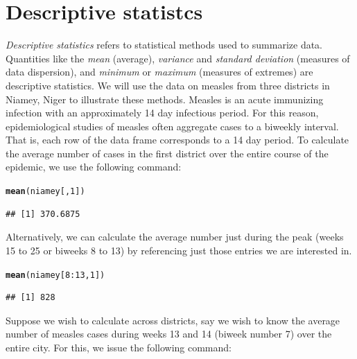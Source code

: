 \documentclass{article}\usepackage[]{graphicx}\usepackage[]{color}
\makeatletter
\newcommand{\hlnum}[1]{\textcolor[rgb]{0.686,0.059,0.569}{#1}}%
\newcommand{\hlopt}[1]{\textcolor[rgb]{0,0,0}{#1}}%
\newcommand{\hlstd}[1]{\textcolor[rgb]{0.345,0.345,0.345}{#1}}%
\newcommand{\hlkwd}[1]{\textcolor[rgb]{0.737,0.353,0.396}{\textbf{#1}}}%
\newenvironment{kframe}{%
 \def\at@end@of@kframe{}%
 \ifinner\ifhmode%
  \def\at@end@of@kframe{\end{minipage}}%
  \begin{minipage}{\columnwidth}%
 \fi\fi%
 \def\FrameCommand##1{\hskip\@totalleftmargin \hskip-\fboxsep
 \colorbox{shadecolor}{##1}\hskip-\fboxsep
     \hskip-\linewidth \hskip-\@totalleftmargin \hskip\columnwidth}%
 \MakeFramed {\advance\hsize-\width
   \@totalleftmargin\z@ \linewidth\hsize
   \@setminipage}}%
 {\par\unskip\endMakeFramed%
 \at@end@of@kframe}
\newenvironment{knitrout}{}{} %
\theoremstyle{exercise}
\makeatother
\begin{document}
\section{Descriptive statistcs}

\textit{Descriptive statistics} refers to statistical methods used to summarize data. Quantities like the \textit{mean} (average), \textit{variance} and \textit{standard deviation} (measures of data dispersion), and \textit{minimum} or \textit{maximum} (measures of extremes) are descriptive statistics. We will use the data on measles from three districts in Niamey, Niger to illustrate these methods. Measles is an acute immunizing infection with an approximately 14 day infectious period. For this reason, epidemiological studies of measles often aggregate cases to a biweekly interval. That is, each row of the data frame corresponds to a 14 day period. To calculate the average number of cases in the first district over the entire course of the epidemic, we use the following command:

\begin{knitrout}
\color{fgcolor}\begin{kframe}
\begin{alltt}
\hlkwd{mean}\hlstd{(niamey[,}\hlnum{1}\hlstd{])}
\end{alltt}
\begin{verbatim}
## [1] 370.6875
\end{verbatim}
\end{kframe}
\end{knitrout}

Alternatively, we can calculate the average number just during the peak (weeks 15 to 25 or biweeks 8 to 13) by referencing just those entries we are interested in.

\begin{knitrout}
\color{fgcolor}\begin{kframe}
\begin{alltt}
\hlkwd{mean}\hlstd{(niamey[}\hlnum{8}\hlopt{:}\hlnum{13}\hlstd{,}\hlnum{1}\hlstd{])}
\end{alltt}
\begin{verbatim}
## [1] 828
\end{verbatim}
\end{kframe}
\end{knitrout}

Suppose we wish to calculate across districts, say we wish to know the average number of measles cases during weeks 13 and 14 (biweek number 7) over the entire city. For this, we issue the following command:
\end{document}
